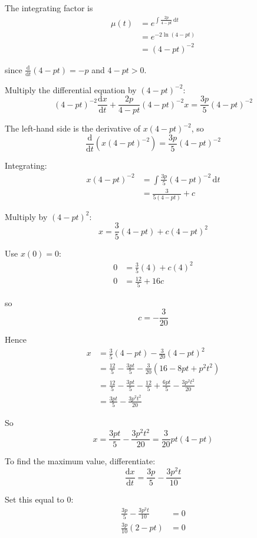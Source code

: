 \documentclass[leqno]{article}
\begin{document}
\begin{enumerate}[
  label=\textbf{\arabic*.},
  leftmargin=*,
  topsep=0pt,
  partopsep=0pt,
  parsep=0pt
]
\begin{djsSolution}
\begin{enumerate}[label=\textbf{(\alph*)}]
\begin{enumerate}[label=(\roman*)]
    The integrating factor is
    \begin{align*}
    \mu(t)&=e^{\int \frac{2p}{4-pt}\,\mathrm{d}t}\\
    &=e^{-2\ln(4-pt)}\\
    &=(4-pt)^{-2}
    \end{align*}

    since $\frac{\mathrm{d}}{\mathrm{d}t}(4-pt)=-p$ and $4-pt>0$.

    Multiply the differential equation by $(4-pt)^{-2}$:
    \[
    (4-pt)^{-2}\frac{\mathrm{d}x}{\mathrm{d}t}+\frac{2p}{4-pt}(4-pt)^{-2}x=\frac{3p}{5}(4-pt)^{-2}
    \]

    The left-hand side is the derivative of $x(4-pt)^{-2}$, so
    \[
    \frac{\mathrm{d}}{\mathrm{d}t}\left(x(4-pt)^{-2}\right)=\frac{3p}{5}(4-pt)^{-2}
    \]

    Integrating:
    \begin{align*}
    x(4-pt)^{-2}&=\int \frac{3p}{5}(4-pt)^{-2}\,\mathrm{d}t \\
    &=\frac{3}{5(4-pt)}+c
    \end{align*}

    Multiply by $(4-pt)^2$:
    \[
    x=\frac{3}{5}(4-pt)+c(4-pt)^2
    \]

    Use $x(0)=0$:
    \begin{align*}
    0 &= \frac{3}{5}(4)+c(4)^2 \\
    0 &= \frac{12}{5}+16c
    \end{align*}

    so
    \[
    c=-\frac{3}{20}
    \]

    Hence
    \begin{align*}
    x
    &= \frac{3}{5}(4-pt)-\frac{3}{20}(4-pt)^2 \\
    &= \frac{12}{5}-\frac{3pt}{5}-\frac{3}{20}\left(16-8pt+p^2t^2\right) \\
    &= \frac{12}{5}-\frac{3pt}{5}-\frac{12}{5}+\frac{6pt}{5}-\frac{3p^2t^2}{20} \\
    &= \frac{3pt}{5}-\frac{3p^2t^2}{20}
    \end{align*}

    So
    \[
    x=\frac{3pt}{5}-\frac{3p^2t^2}{20}=\frac{3}{20}pt(4-pt)
    \]

    To find the maximum value, differentiate:
    \[
    \frac{\mathrm{d}x}{\mathrm{d}t}= \frac{3p}{5}-\frac{3p^2t}{10}
    \]

    Set this equal to $0$:
    \begin{align*}
    \frac{3p}{5}-\frac{3p^2t}{10} &= 0 \\
    \frac{3p}{10}(2-pt) &= 0
    \end{align*}


\end{enumerate}
\end{enumerate}
\end{djsSolution}
\end{enumerate}
\end{document}
